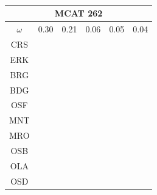 \documentclass[12pt]{article}
\begin{document}
\begin{landscape}
\begin{figure}
{\begin{minipage}[c]{0.3\textwidth}
\begin{tabular}{|c|c|c|c|c|c|}
\end{tabular}\\$~$\\$~$\\
\hspace*{-2.5cm}
\begin{tabular}{|c|c|c|c|c|c|}                                                                                                        
         \hline \multicolumn{6}{|c|}{MCAT 262} \\ \hline                                                                              
         $\omega$&0.30&0.21&0.06&0.05&0.04 \\ \hline                                                                                  
        CRS&\cellcolor[HTML]{E41A1C}&\cellcolor[HTML]{E41A1C}&\cellcolor[HTML]{E41A1C}&\cellcolor[HTML]{E41A1C}&\cellcolor[HTML]{E41A1C} \\ \hline
        ERK&\cellcolor[HTML]{E41A1C}&\cellcolor[HTML]{E41A1C}&\cellcolor[HTML]{E41A1C}&\cellcolor[HTML]{E41A1C}&\cellcolor[HTML]{E41A1C} \\ \hline
        BRG&\cellcolor[HTML]{E41A1C}&\cellcolor[HTML]{E41A1C}&\cellcolor[HTML]{377EB8}&\cellcolor[HTML]{E41A1C}&\cellcolor[HTML]{E41A1C} \\ \hline
        BDG&\cellcolor[HTML]{377EB8}&\cellcolor[HTML]{377EB8}&\cellcolor[HTML]{377EB8}&\cellcolor[HTML]{377EB8}&\cellcolor[HTML]{377EB8} \\ \hline
        OSF&\cellcolor[HTML]{377EB8}&\cellcolor[HTML]{377EB8}&\cellcolor[HTML]{377EB8}&\cellcolor[HTML]{4DAF4A}&\cellcolor[HTML]{4DAF4A} \\ \hline
        MNT&\cellcolor[HTML]{377EB8}&\cellcolor[HTML]{377EB8}&\cellcolor[HTML]{4DAF4A}&\cellcolor[HTML]{4DAF4A}&\cellcolor[HTML]{4DAF4A} \\ \hline
        MRO&\cellcolor[HTML]{4DAF4A}&\cellcolor[HTML]{4DAF4A}&\cellcolor[HTML]{4DAF4A}&\cellcolor[HTML]{984EA3}&\cellcolor[HTML]{984EA3} \\ \hline
        OSB&\cellcolor[HTML]{984EA3}&\cellcolor[HTML]{984EA3}&\cellcolor[HTML]{984EA3}&\cellcolor[HTML]{984EA3}&\cellcolor[HTML]{FF7F00} \\ \hline
        OLA&\cellcolor[HTML]{984EA3}&\cellcolor[HTML]{FF7F00}&\cellcolor[HTML]{984EA3}&\cellcolor[HTML]{FF7F00}&\cellcolor[HTML]{FFFF33} \\ \hline
        OSD&\cellcolor[HTML]{FF7F00}&\cellcolor[HTML]{FF7F00}&\cellcolor[HTML]{984EA3}&\cellcolor[HTML]{FFFF33}&\cellcolor[HTML]{A65628} \\ \hline

\end{tabular}
\end{minipage}}
\end{figure}
\end{landscape}
\end{document}
